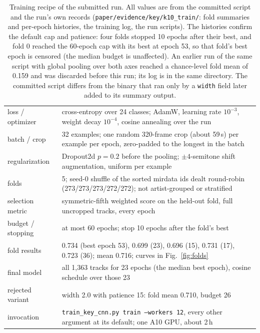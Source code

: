 \documentclass{article}
\begin{document}
\begin{table}[t]
\centering\small
\setlength{\tabcolsep}{4pt}
\begin{tabular}{p{}p{}}
\toprule
loss / optimizer & cross-entropy over 24 classes; AdamW, learning rate $10^{-3}$, weight decay $10^{-4}$, cosine annealing over the run \\
batch / crop & 32 examples; one random 320-frame crop (about 59\,s) per example per epoch, zero-padded to the longest in the batch \\
regularization & Dropout2d $p{=}0.2$ before the pooling; $\pm4$-semitone shift augmentation, uniform per example \\
folds & 5; seed-0 shuffle of the sorted mirdata ids dealt round-robin (273/273/273/272/272); not artist-grouped or stratified \\
selection metric & symmetric-fifth weighted score on the held-out fold, full uncropped tracks, every epoch \\
budget / stopping & at most 60 epochs; stop 10 epochs after the fold's best \\
fold results & 0.734 (best epoch 53), 0.699 (23), 0.696 (15), 0.731 (17), 0.723 (36); mean 0.716; curves in Fig.~\ref{fig:folds} \\
final model & all 1{,}363 tracks for 23 epochs (the median best epoch), cosine schedule over those 23 \\
rejected variant & width 2.0 with patience 15: fold mean 0.710, budget 26 \\
invocation & \texttt{train\_key\_cnn.py train --workers 12}, every other argument at its default; one A10 GPU, about 2\,h \\
\bottomrule
\end{tabular}
\caption{Training recipe of the submitted run. All values are from the committed script and
the run's own records (\texttt{paper/evidence/key/k10\_train/}: fold summaries and
per-epoch histories, the training log, the run scripts). The histories confirm the
default cap and patience: four folds stopped 10 epochs after their best, and fold 0
reached the 60-epoch cap with its best at epoch 53, so that fold's best epoch is
censored (the median budget is unaffected). An earlier run of the same script with
global pooling over both axes reached a chance-level fold mean of 0.159 and was
discarded before this run; its log is in the same directory. The committed script
differs from the binary that ran only by a \texttt{width} field later added to its
summary output.}
\label{tab:train}
\end{table}
\end{document}
